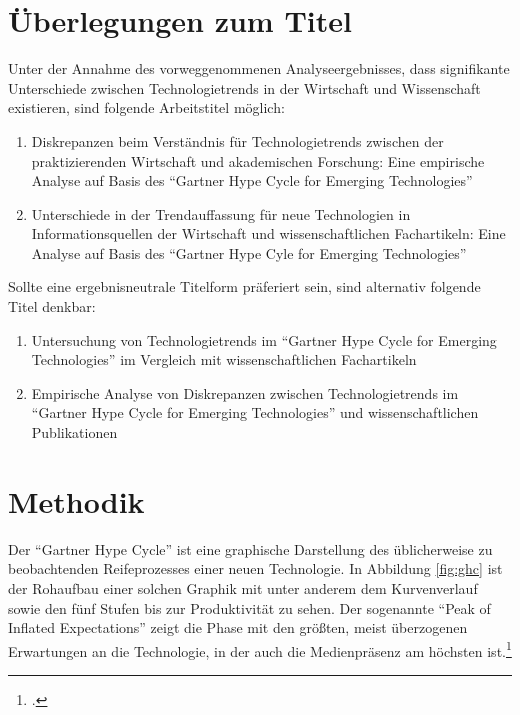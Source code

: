 \section{Überlegungen zum Titel}
Unter der Annahme des vorweggenommenen Analyseergebnisses, dass signifikante Unterschiede zwischen Technologietrends in der Wirtschaft und Wissenschaft existieren, sind folgende Arbeitstitel möglich:
\begin{enumerate}
	\item Diskrepanzen beim Verständnis für Technologietrends zwischen der praktizierenden Wirtschaft und akademischen Forschung: Eine empirische Analyse auf Basis des "`Gartner Hype Cycle for Emerging Technologies"'
	\item Unterschiede in der Trendauffassung für neue Technologien in Informationsquellen der Wirtschaft und wissenschaftlichen Fachartikeln: Eine Analyse auf Basis des "`Gartner Hype Cyle for Emerging Technologies"'
\end{enumerate}

Sollte eine ergebnisneutrale Titelform präferiert sein, sind alternativ folgende Titel denkbar:
\begin{enumerate}
	\item Untersuchung von Technologietrends im "`Gartner Hype Cycle for Emerging Technologies"' im Vergleich mit wissenschaftlichen Fachartikeln
	\item Empirische Analyse von Diskrepanzen zwischen Technologietrends im "`Gartner Hype Cycle for Emerging Technologies"' und wissenschaftlichen Publikationen
\end{enumerate}


\section{Methodik}
Der "`Gartner Hype Cycle"' ist eine graphische Darstellung des üblicherweise zu beobachtenden Reifeprozesses einer neuen Technologie. In Abbildung \ref{fig:ghc} ist der Rohaufbau einer solchen Graphik mit unter anderem dem Kurvenverlauf sowie den fünf Stufen bis zur Produktivität zu sehen. Der sogenannte "`Peak of Inflated Expectations"' zeigt die Phase mit den größten, meist überzogenen Erwartungen an die Technologie, in der auch die Medienpräsenz am höchsten ist.\footcite[Vgl.][S.~3f]{Fenn2017}

